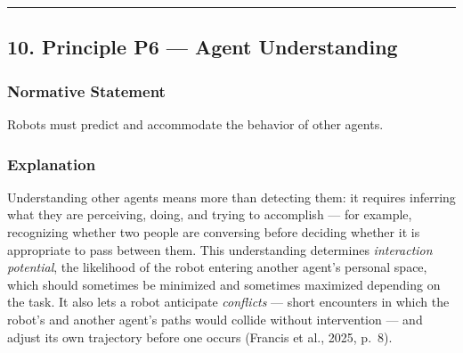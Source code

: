 \documentclass[utf8]{frontiers_suppmat} %
\newenvironment{Shaded}{\begin{shaded}}{\end{shaded}}
\begin{document}
\begin{center}\rule{0.5\linewidth}{0.5pt}\end{center}

\subsection{10. Principle P6 --- Agent
Understanding}\label{principle-p6-agent-understanding}

\subsubsection{Normative Statement}\label{normative-statement-6}

Robots must predict and accommodate the behavior of other agents.

\subsubsection{Explanation}\label{explanation-6}

Understanding other agents means more than detecting them: it requires
inferring what they are perceiving, doing, and trying to accomplish ---
for example, recognizing whether two people are conversing before
deciding whether it is appropriate to pass between them. This
understanding determines \emph{interaction potential}, the likelihood of
the robot entering another agent's personal space, which should
sometimes be minimized and sometimes maximized depending on the task. It
also lets a robot anticipate \emph{conflicts} --- short encounters in
which the robot's and another agent's paths would collide without
intervention --- and adjust its own trajectory before one occurs
(Francis et al., 2025, p.~8).

\begin{Shaded}
\begin{Highlighting}[]
\KeywordTok{:}
\KeywordTok{:}
\KeywordTok{:}
\KeywordTok{: }\CharTok{\textgreater{}}
\KeywordTok{:}
\AttributeTok{  }\KeywordTok{:}
\AttributeTok{    }\KeywordTok{{-}}\AttributeTok{ }
\AttributeTok{    }\KeywordTok{{-}}\AttributeTok{ }
\AttributeTok{  }\KeywordTok{:}
\AttributeTok{    }\KeywordTok{{-}}\AttributeTok{ }
\AttributeTok{    }\KeywordTok{{-}}\AttributeTok{ }
\end{Highlighting}
\end{Shaded}
\end{document}
